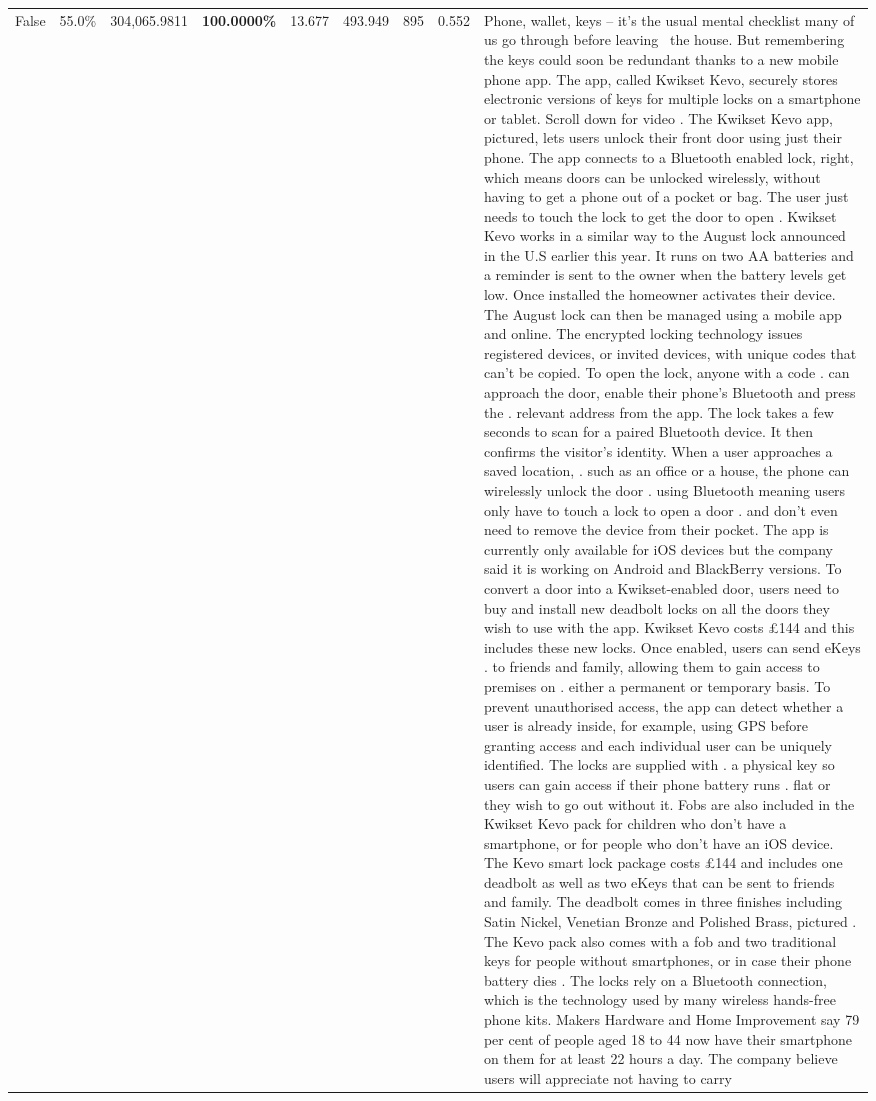 \begin{table}[H]
\begin{tabular}{lllrlllll}
False & 55.0\% & \color{red} 304,065.9811 & \bfseries \color{red} 100.0000\% & 13.677 & 493.949 & 895 & 0.552 & Phone, wallet, keys – it’s the usual mental checklist many of us go through before leaving  the house. But remembering the keys could soon be redundant thanks to a new mobile phone app. The app, called Kwikset Kevo, securely stores electronic versions of keys for multiple locks on a smartphone or tablet. Scroll down for video . The Kwikset Kevo app, pictured, lets users unlock their front door using just their phone. The app connects to a Bluetooth enabled lock, right, which means doors can be unlocked wirelessly, without having to get a phone out of a pocket or bag. The user just needs to touch the lock to get the door to open . Kwikset Kevo works in a similar way to the August lock announced in the U.S earlier this year. It runs on two AA batteries and a reminder is sent to the owner when the battery levels get low. Once installed the homeowner activates their device. The August lock can then be managed using a mobile app and online. The encrypted locking technology issues registered devices, or invited devices, with unique codes that can't be copied. To open the lock, anyone with a code . can approach the door, enable their phone's Bluetooth and press the . relevant address from the app. The lock takes a few seconds to scan for a paired Bluetooth device. It then confirms the visitor's identity. When a user approaches a saved location, . such as an office or a house, the phone can wirelessly unlock the door . using Bluetooth meaning users only have to touch a lock to open a door . and don't even need to remove the device from their pocket. The app is currently only available for iOS devices but the company said it is working on Android and BlackBerry versions. To convert a door into a Kwikset-enabled door, users need to buy and install new deadbolt locks on all the doors they wish to use with the app. Kwikset Kevo costs £144 and this includes these new locks. Once enabled, users can send eKeys . to friends and family, allowing them to gain access to premises on . either a permanent or temporary basis. To prevent unauthorised access, the app can detect whether a user is already inside, for example, using GPS before granting access and each individual user can be uniquely identified. The locks are supplied with . a physical key so users can gain access if their phone battery runs . flat or they wish to go out without it. Fobs are also included in the Kwikset Kevo pack for children who don't have a smartphone, or for people who don't have an iOS device. The Kevo smart lock package costs £144 and includes one deadbolt as well as two eKeys that can be sent to friends and family. The deadbolt comes in three finishes including Satin Nickel, Venetian Bronze and Polished Brass, pictured . The Kevo pack also comes with a fob and two traditional keys for people without smartphones, or in case their phone battery dies . The locks rely on a Bluetooth connection, which is the technology used by many wireless hands-free phone kits. Makers Hardware and Home Improvement say 79 per cent of people aged 18 to 44 now have their smartphone on them for at least 22 hours a day. The company believe users will appreciate not having to carry 
\end{tabular}
\end{table}
